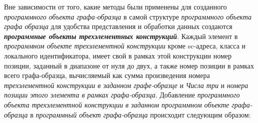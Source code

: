 Вне зависимости от того, какие методы были применены для созданного \textit{программного объекта графа-образца} в самой структуре \textit{программного объекта графа образца} для удобства представления и обработки данных создаются  \textbf{\textit{программные объекты трехэлементных конструкций}}. Каждый элемент в \textit{программном объекте трехэлементной конструкции} кроме sc-адреса, класса и локального идентификатора, имеет свой в рамках этой конструкции номер позиции, заданный в диапазоне от нуля до двух, а также номер позиции в рамках всего графа-образца, вычисляемый как сумма произведения номера \textit{трехэлементной конструкции в заданном графе-образце} и \textit{Числа три} и \textit{номера позиции этого элемента в рамках графа-образца}. Добавление \textit{программного объекта трехэлементной конструкции в заданном программном объекте графа-образца} в \textit{программный объект графа-образца} происходит следующим образом:
